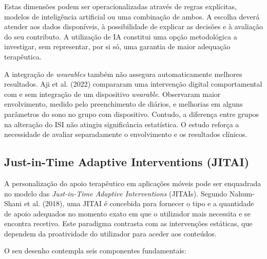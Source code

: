 Estas dimensões podem ser operacionalizadas através de regras explícitas, modelos de inteligência artificial ou uma combinação de ambos. A escolha deverá atender aos dados disponíveis, à possibilidade de explicar as decisões e à avaliação do seu contributo. A utilização de IA constitui uma opção metodológica a investigar, sem representar, por si só, uma garantia de maior adequação terapêutica.

A integração de \textit{wearables} também não assegura automaticamente melhores resultados. Aji et al. (2022) compararam uma intervenção digital comportamental com e sem integração de um dispositivo \textit{wearable}. Observaram maior envolvimento, medido pelo preenchimento de diários, e melhorias em alguns parâmetros do sono no grupo com dispositivo. Contudo, a diferença entre grupos na alteração do ISI não atingiu significância estatística. O estudo reforça a necessidade de avaliar separadamente o envolvimento e os resultados clínicos.

\subsection{Just-in-Time Adaptive Interventions (JITAI)}
\label{sec:chap2_jitai}

A personalização do apoio terapêutico em aplicações móveis pode ser enquadrada no modelo das \textit{Just-in-Time Adaptive Interventions} (JITAIs). Segundo Nahum-Shani et al. (2018), uma JITAI é concebida para fornecer o tipo e a quantidade de apoio adequados no momento exato em que o utilizador mais necessita e se encontra recetivo. Este paradigma contrasta com as intervenções estáticas, que dependem da proatividade do utilizador para aceder aos conteúdos. 

O seu desenho contempla seis componentes fundamentais:

